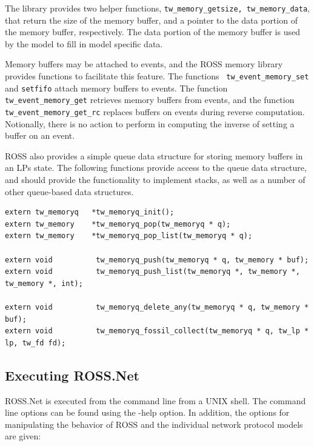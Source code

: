\documentclass[12pt]{article}
\begin{document}
The library provides two helper functions, {\tt tw\_memory\_getsize,
  tw\_memory\_data}, that return the size of the memory buffer, and a pointer
to the data portion of the memory buffer, respectively.  The data portion of
the memory buffer is used by the model to fill in model specific data.

Memory buffers may be attached to events, and the ROSS memory library provides
functions to facilitate this feature.  The functions {\tt
  tw\_event\_memory\_set} and {\tt setfifo} attach memory buffers to events.
The function {\tt tw\_event\_memory\_get} retrieves memory buffers from
events, and the function {\tt tw\_event\_memory\_get\_rc} replaces buffers on
events during reverse computation.  Notionally, there is no action to perform
in computing the inverse of setting a buffer on an event.

ROSS also provides a simple queue data structure for storing memory buffers in
an LPs state.  The following functions provide access to the queue data
structure, and should provide the functionality to implement stacks, as well
as a number of other queue-based data structures.

\begin{small}
\begin{verbatim}
extern tw_memoryq   *tw_memoryq_init();
extern tw_memory    *tw_memoryq_pop(tw_memoryq * q);
extern tw_memory    *tw_memoryq_pop_list(tw_memoryq * q);

extern void          tw_memoryq_push(tw_memoryq * q, tw_memory * buf);
extern void          tw_memoryq_push_list(tw_memoryq *, tw_memory *, tw_memory *, int);

extern void          tw_memoryq_delete_any(tw_memoryq * q, tw_memory * buf);
extern void          tw_memoryq_fossil_collect(tw_memoryq * q, tw_lp * lp, tw_fd fd);
\end{verbatim}
\end{small}

\subsection{Executing ROSS.Net}

ROSS.Net is executed from the command line from a UNIX shell.  The command
line options can be found using the -help option.  In addition, the options
for manipulating the behavior of ROSS and the individual network protocol
models are given:
\end{document}
